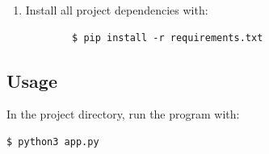 \documentclass[11pt]{article}
\begin{document}
{\begin{enumerate}
		\item Install all project dependencies with:
		\begin{verbatim}
		$ pip install -r requirements.txt
		\end{verbatim}
	\end{enumerate}




\subsection{Usage}
In the project directory, run the program with:

\begin{verbatim}
$ python3 app.py
\end{verbatim}

\newpage
\printbibliography[heading=bibintoc, title={Sources}]





}
\end{document}
